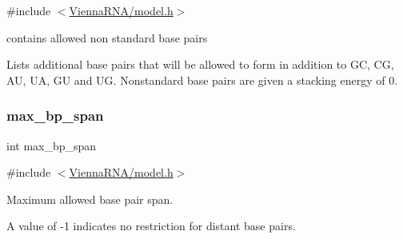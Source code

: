 {\ttfamily \#include $<$\mbox{\hyperlink{model_8h}{Vienna\+R\+N\+A/model.\+h}}$>$}



contains allowed non standard base pairs 

Lists additional base pairs that will be allowed to form in addition to GC, CG, AU, UA, GU and UG. Nonstandard base pairs are given a stacking energy of 0. \mbox{\label{group__model__details_ga18df869af0d70101106458fc3f027806}} 
\subsubsection{\texorpdfstring{max\_bp\_span}{max\_bp\_span}}
{\footnotesize\ttfamily int max\+\_\+bp\+\_\+span}



{\ttfamily \#include $<$\mbox{\hyperlink{model_8h}{Vienna\+R\+N\+A/model.\+h}}$>$}



Maximum allowed base pair span. 

A value of -\/1 indicates no restriction for distant base pairs. 